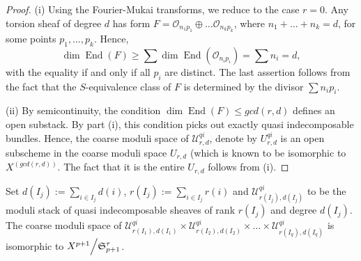 \documentclass[reqno]{amsart}
\theoremstyle{definition}
\theoremstyle{remark}
\newcommand{\OO}{{\mathcal O}}
\newcommand{\End}{\operatorname{End}}
\newcommand{\cU}{\mathcal{U}}
\newcommand{\cM}{\mathcal{M}}
\newcommand{\fS}{\mathfrak{S}}
\numberwithin{equation}{section}
\begin{document}
\begin{proof}
(i) Using the Fourier-Mukai transforms, we reduce to the case $r=0$. Any torsion sheaf of degree $d$ has form $F=\OO_{n_1p_1}\oplus\ldots \OO_{n_kp_k}$, where
$n_1+\ldots +n_k=d$, for some points $p_1,\ldots,p_k$. 
Hence,
$$\dim\End(F)\ge \sum \dim\End(\OO_{n_i p_i})=\sum n_i=d,$$
with the equality if and only if all $p_i$ are distinct. The last assertion follows from the fact that the $S$-equivalence class of $F$ is determined by the divisor $\sum n_i p_i$.

\noindent
(ii) By semicontinuity, the condition $\dim \End(F)\le gcd(r,d)$ defines an open substack. By part (i), this condition picks out exactly quasi indecomposable bundles.
Hence, the coarse moduli space of $\cU^{qi}_{r,d}$, denote by $U^{qi}_{r,d}$
is an open subscheme in the coarse moduli space $U_{r,d}$ (which is known to be isomorphic to $X^{(gcd(r,d))}$.
The fact that it is the entire $U_{r,d}$ follows from (i).
\end{proof}


Set $d(I_j):=\sum_{i\in I_j} d(i)$, $r(I_j):=\sum_{i\in I_j}r(i)$ and $\cU^{qi}_{r(I_j), d(I_j)}$ to be the moduli stack of quasi indecomposable sheaves of rank $r(I_j)$ and degree $d(I_j)$. The coarse moduli space of
$\cU^{qi}_{r(I_1), d(I_1)}\times \cU^{qi}_{r(I_2), d(I_2)}\times\ldots\times \cU^{qi}_{r(I_q), d(I_q)}$ is isomorphic to $X^{p+1}\Big\slash \fS^\tau_{p+1}$. 
\end{document}
